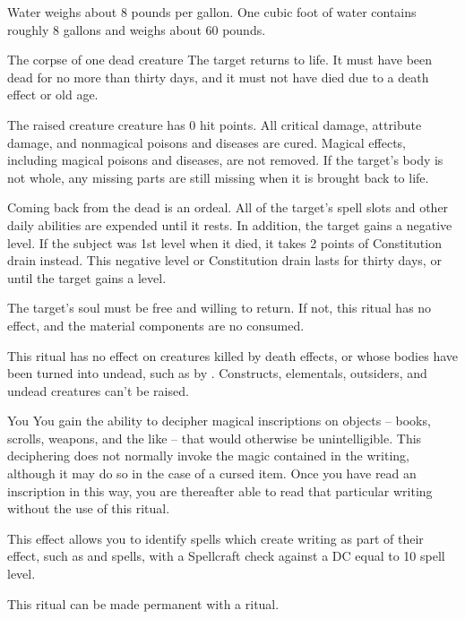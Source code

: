 Water weighs about 8 pounds per gallon. One cubic foot of water contains roughly 8 gallons and weighs about 60 pounds.

\begin{spelltarget}{The corpse of one dead creature}
    \spelleffect The target returns to life. It must have been dead for no more than thirty days, and it must not have died due to a death effect or old age.

    The raised creature creature has 0 hit points. All critical damage, attribute damage, and nonmagical poisons and diseases are cured. Magical effects, including magical poisons and diseases, are not removed. If the target's body is not whole, any missing parts are still missing when it is brought back to life.

    \par Coming back from the dead is an ordeal. All of the target's spell slots and other daily abilities are expended until it rests. In addition, the target gains a negative level. If the subject was 1st level when it died, it takes 2 points of Constitution drain instead. This negative level or Constitution drain lasts for thirty days, or until the target gains a level.
\end{spelltarget}
\spellnotes The target's soul must be free and willing to return. If not, this ritual has no effect, and the material components are no consumed.

This ritual has no effect on creatures killed by death effects, or whose bodies have been turned into undead, such as by . Constructs, elementals, outsiders, and undead creatures can't be raised.

\spelldur{\durlong}
\begin{spelltarget}{You}
    \spelleffect You gain the ability to decipher magical inscriptions on objects -- books, scrolls, weapons, and the like -- that would otherwise be unintelligible. This deciphering does not normally invoke the magic contained in the writing, although it may do so in the case of a cursed item. Once you have read an inscription in this way, you are thereafter able to read that particular writing without the use of this ritual.

    This effect allows you to identify spells which create writing as part of their effect, such as  and  spells, with a Spellcraft check against a DC equal to 10 \add spell level.
\end{spelltarget}
\spellnotes This ritual can be made permanent with a  ritual.


